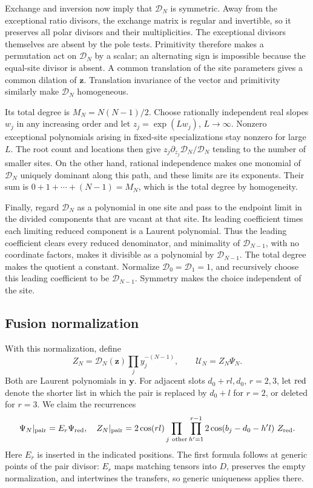 Exchange and inversion now imply that \(\mathscr D_N\) is symmetric. Away from the exceptional ratio divisors, the exchange matrix is regular and invertible, so it preserves all polar divisors and their multiplicities. The exceptional divisors themselves are absent by the pole tests. Primitivity therefore makes a permutation act on \(\mathscr D_N\) by a scalar; an alternating sign is impossible because the equal-site divisor is absent. A common translation of the site parameters gives a common dilation of \(\mathbf z\). Translation invariance of the vector and primitivity similarly make \(\mathscr D_N\) homogeneous.

Its total degree is \(M_N=N(N-1)/2\). Choose rationally independent real slopes \(w_j\) in any increasing order and let \(z_j=\exp(Lw_j)\), \(L\to\infty\). Nonzero exceptional polynomials arising in fixed-site specializations stay nonzero for large \(L\). The root count and locations then give
\(z_j\partial_{z_j}\mathscr D_N/\mathscr D_N\) tending to the number of smaller sites. On the other hand, rational independence makes one monomial of \(\mathscr D_N\) uniquely dominant along this path, and these limits are its exponents. Their sum is \(0+1+\cdots+(N-1)=M_N\), which is the total degree by homogeneity.

Finally, regard \(\mathscr D_N\) as a polynomial in one site and pass to the endpoint limit in the divided components that are vacant at that site. Its leading coefficient times each limiting reduced component is a Laurent polynomial. Thus the leading coefficient clears every reduced denominator, and minimality of \(\mathscr D_{N-1}\), with no coordinate factors, makes it divisible as a polynomial by \(\mathscr D_{N-1}\). The total degree makes the quotient a constant. Normalize \(\mathscr D_0=\mathscr D_1=1\), and recursively choose this leading coefficient to be \(\mathscr D_{N-1}\). Symmetry makes the choice independent of the site.

\subsection{Fusion normalization}

With this normalization, define
\[
 Z_N=\mathscr D_{N}(\mathbf z)\prod_j y_j^{-(N-1)},\qquad \mathcal U_N=Z_N\Psi_N .
\]
Both are Laurent polynomials in \(\mathbf y\). For adjacent slots \(d_0+rl,d_0\), \(r=2,3\), let \({\rm red}\) denote the shorter list in which the pair is replaced by \(d_0+l\) for \(r=2\), or deleted for \(r=3\). We claim the recurrences
\begin{equation}\label{eq:vacuum-fusion}
 \Psi_N|_{\rm pair}=E_r\Psi_{\rm red},\quad
 Z_N|_{\rm pair}=2\cos(rl)\prod_{j\ {\rm other}}\prod_{h'=1}^{r-1} 2\cos(b_j-d_0-h'l)\ Z_{\rm red}.
\end{equation}
Here \(E_r\) is inserted in the indicated positions. The first formula follows at generic points of the pair divisor: \(E_r\) maps matching tensors into \(D\), preserves the empty normalization, and intertwines the transfers, so generic uniqueness applies there.

